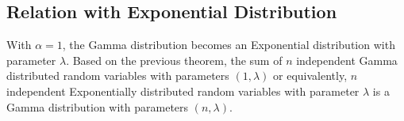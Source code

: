 \documentclass[../probability-notes.tex]{subfiles}
\begin{document}
    \subsection{Relation with Exponential Distribution}
    With $\alpha = 1$, the Gamma distribution becomes an Exponential distribution with parameter $\lambda$. Based on the previous theorem, the sum of $n$ independent Gamma distributed random variables with parameters $(1, \lambda)$ or equivalently, $n$ independent Exponentially distributed random variables with parameter $\lambda$ is a Gamma distribution with parameters $(n, \lambda)$.
\end{document}

